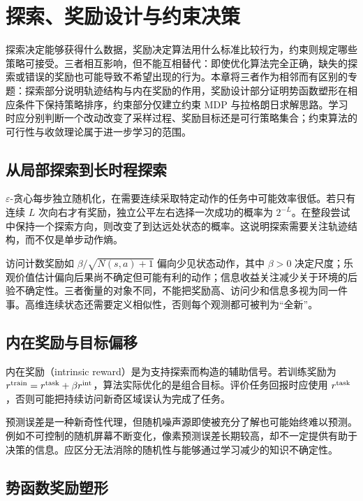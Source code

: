 \setcounter{chapter}{18} %
\chapter{探索、奖励设计与约束决策}
\label{ch:rl-exploration}

探索决定能够获得什么数据，奖励决定算法用什么标准比较行为，约束则规定哪些策略可接受。三者相互影响，但不能互相替代：即使优化算法完全正确，缺失的探索或错误的奖励也可能导致不希望出现的行为。本章将三者作为相邻而有区别的专题：探索部分说明轨迹结构与内在奖励的作用，奖励设计部分证明势函数塑形在相应条件下保持策略排序，约束部分仅建立约束 MDP 与拉格朗日求解思路。学习时应分别判断一个改动改变了采样过程、奖励目标还是可行策略集合；约束算法的可行性与收敛理论属于进一步学习的范围。

\section{从局部探索到长时程探索}

$\varepsilon$-贪心每步独立随机化，在需要连续采取特定动作的任务中可能效率很低。若只有连续 $L$ 次向右才有奖励，独立公平左右选择一次成功的概率为 $2^{-L}$。在整段尝试中保持一个探索方向，则改变了到达远处状态的概率。这说明探索需要关注轨迹结构，而不仅是单步动作熵。

访问计数奖励如 $\beta/\sqrt{N(s,a)+1}$ 偏向少见状态动作，其中 $\beta>0$ 决定尺度；乐观价值估计偏向后果尚不确定但可能有利的动作；信息收益关注减少关于环境的后验不确定性。三者衡量的对象不同，不能把奖励高、访问少和信息多视为同一件事。高维连续状态还需要定义相似性，否则每个观测都可被判为“全新”。

\section{内在奖励与目标偏移}

内在奖励（intrinsic reward）是为支持探索而构造的辅助信号。若训练奖励为 $r^{\rm train}=r^{\rm task}+\beta r^{\rm int}$，算法实际优化的是组合目标。评价任务回报时应使用 $r^{\rm task}$，否则可能把持续访问新奇区域误认为完成了任务。

预测误差是一种新奇性代理，但随机噪声源即使被充分了解也可能始终难以预测。例如不可控制的随机屏幕不断变化，像素预测误差长期较高，却不一定提供有助于决策的信息。应区分无法消除的随机性与能够通过学习减少的知识不确定性。

\section{势函数奖励塑形}

